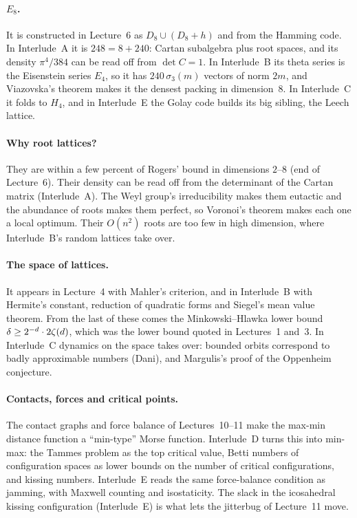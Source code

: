 \paragraph{$E_8$.} It is constructed in Lecture~6 as $D_8\cup(D_8+h)$ and from the Hamming code. In
Interlude~A it is $248=8+240$: Cartan subalgebra plus root spaces, and its density $\pi^4/384$ can be
read off from $\det C=1$. In Interlude~B its theta series is the Eisenstein series $E_4$, so it has
$240\,\sigma_3(m)$ vectors of norm $2m$, and Viazovska's theorem makes it the densest packing in
dimension~$8$. In Interlude~C it folds to $H_4$, and in Interlude~E the Golay code builds its big
sibling, the Leech lattice.

\paragraph{Why root lattices?} They are within a few percent of Rogers' bound in dimensions $2$--$8$
(end of Lecture~6). Their density can be read off from the determinant of the Cartan matrix
(Interlude~A). The Weyl group's irreducibility makes them eutactic and the abundance of roots makes them
perfect, so Voronoi's theorem makes each one a local optimum. Their $O(n^2)$ roots are too few in high
dimension, where Interlude~B's random lattices take over.

\paragraph{The space of lattices.} It appears in Lecture~4 with Mahler's criterion, and in
Interlude~B with Hermite's constant, reduction of quadratic forms and Siegel's mean value theorem. From
the last of these comes the Minkowski--Hlawka lower bound $\delta\ge 2^{-d}\cdot2\zeta(d)$, which was the
lower bound quoted in Lectures~1 and~3. In Interlude~C dynamics on the space takes over: bounded orbits
correspond to badly approximable numbers (Dani), and Margulis's proof of the Oppenheim conjecture.

\paragraph{Contacts, forces and critical points.} The contact graphs and force balance of
Lectures~10--11 make the max-min distance function a ``min-type'' Morse function. Interlude~D turns this
into min-max: the Tammes problem as the top critical value, Betti numbers of configuration spaces as
lower bounds on the number of critical configurations, and kissing numbers. Interlude~E reads the same
force-balance condition as jamming, with Maxwell counting and isostaticity. The slack in the
icosahedral kissing configuration (Interlude~E) is what lets the jitterbug of Lecture~11 move.

